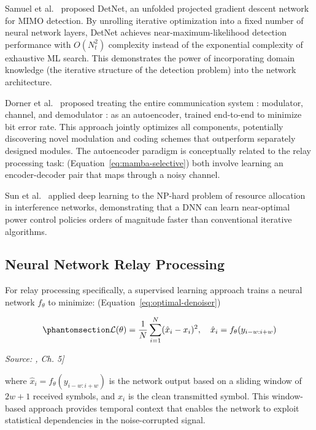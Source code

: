 Samuel et al.~\cite{SamuelDiskinWunder2019MIMODetect} proposed DetNet, an unfolded projected gradient descent network for MIMO detection. By unrolling iterative optimization into a fixed number of neural network layers, DetNet achieves near-maximum-likelihood detection performance with \(O(N_t^2)\) complexity instead of the exponential complexity of exhaustive ML search. This demonstrates the power of incorporating domain knowledge (the iterative structure of the detection problem) into the network architecture.

Dorner et al.~\cite{Dorner2018OverTheAirDL} proposed treating the entire communication system : modulator, channel, and demodulator : as an autoencoder, trained end-to-end to minimize bit error rate. This approach jointly optimizes all components, potentially discovering novel modulation and coding schemes that outperform separately designed modules. The autoencoder paradigm is conceptually related to the relay processing task: (Equation~\ref{eq:mamba-selective}) both involve learning an encoder-decoder pair that maps through a noisy channel.

Sun et al.~\cite{Sun2018LearnToOptimize} applied deep learning to the NP-hard problem of resource allocation in interference networks, demonstrating that a DNN can learn near-optimal power control policies orders of magnitude faster than conventional iterative algorithms.

\subsection{Neural Network Relay Processing}\label{sec:neural-network-relay-processing}

For relay processing specifically, a supervised learning approach trains a neural network \(f_\theta\) to minimize: (Equation~\ref{eq:optimal-denoiser})

\begin{equation}\protect\phantomsection\label{eq:mse-loss}{\mathcal{L}(\theta) = \frac{1}{N} \sum_{i=1}^{N} (\hat{x}_i - x_i)^2, \quad \hat{x}_i = f_\theta(y_{i-w:i+w})
}\end{equation} \par{\small\textit{Source: \cite{GoodfellowBengioCourville2016DeepLearning}, Ch. 5]}}

where \(\hat{x}_i = f_\theta(y_{i-w:i+w})\) is the network output based on a sliding window of \(2w+1\) received symbols, and \(x_i\) is the clean transmitted symbol. This window-based approach provides temporal context that enables the network to exploit statistical dependencies in the noise-corrupted signal.

